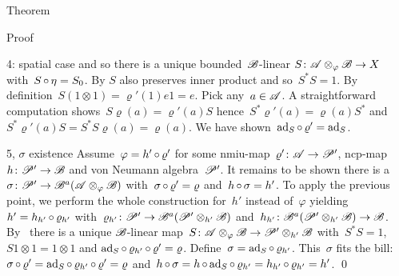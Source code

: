 \documentclass[b]{subfiles}
\begin{document}
\begin{parsec}
\begin{point}{Theorem}
\begin{point}{Proof}
\begin{point}{4: spatial case}
    and so there is a unique bounded~$\mathscr{B}$-linear
    $S \colon \mathscr{A} \otimes_\varphi \mathscr{B} \to X$
    with~$S \mathop{\circ} \eta = S_0$.
By  $S$ also preserves inner product and so~$S^*S = 1$.
By definition~$S (1\otimes1) = \varrho'(1)e 1 = e$.
Pick any~$a \in \mathscr{A}$.
A straightforward computation shows~$S \varrho(a) = \varrho'(a) S$
hence~$S^* \varrho'(a) = \varrho(a) S^*$
and~$S^* \varrho'(a) S = S^*S \varrho(a) = \varrho(a)$.
We have shown~$\mathrm{ad}_S \mathop{\circ} \varrho' = \mathrm{ad}_S$.
\end{point}
\begin{point}{5, $\sigma$ existence}
Assume~$\varphi = h' \mathop{\circ} \varrho'$
    for some nmiu-map~$\varrho'\colon \mathscr{A} \to \mathscr{P}'$,
        ncp-map~$h\colon \mathscr{P}' \to \mathscr{B}$
        and von Neumann algebra~$\mathscr{P}'$.
It remains to be shown there is a ~$\sigma\colon \mathscr{P}' \to \mathscr{B}^a(\mathscr{A}\otimes_\varphi\mathscr{B})$
with~$\sigma\mathop{\circ}\varrho'=\varrho$ and~$h \mathop{\circ} \sigma = h'$.
To apply the previous point,
    we perform the whole construction for~$h'$ instead of~$\varphi$
    yielding
    $h' = h_{h'} \mathop{\circ} \varrho_{h'}$
    with~$\varrho_{h'} \colon \mathscr{P}' \to \mathscr{B}^a (\mathscr{P}' \otimes_{h'} \mathscr{B})$
    and~$h_{h'} \colon \mathscr{B}^a(\mathscr{P}' \otimes_{h'} \mathscr{B}) \to \mathscr{B}$.
By~
    there is a unique 
    $\mathscr{B}$-linear map~$S\colon \mathscr{A} \otimes_{\varphi} \mathscr{B} \to
                                \mathscr{P}' \otimes_{h'} \mathscr{B}$
with~$S^*S = 1$, $S 1\otimes1 = 1\otimes1$ and
$\mathrm{ad}_S \mathop{\circ} \varrho_{h'}\mathop{\circ} \varrho' = \varrho$.
Define~$\sigma = \mathrm{ad}_S \mathop{\circ} \varrho_{h'}$.
This~$\sigma$ fits the bill:
$\sigma \mathop{\circ} \varrho' = \mathrm{ad}_S \mathop{\circ} \varrho_{h'} \mathop{\circ} \varrho'
                                = \varrho$
and~$h \mathop{\circ} \sigma = h \mathop{\circ} \mathrm{ad}_S \mathop{\circ} \varrho_{h'}
= h_{h'} \mathop{\circ} \varrho_{h'} = h'$. \qed
\end{point}
\end{point}
\end{point}
\end{parsec}
\end{document}
